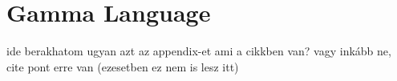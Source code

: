 \section{Gamma Language}\label{sec:gamma-language}

ide berakhatom ugyan azt az appendix-et ami a cikkben van? vagy inkább ne, cite pont erre van (ezesetben ez nem is lesz itt)